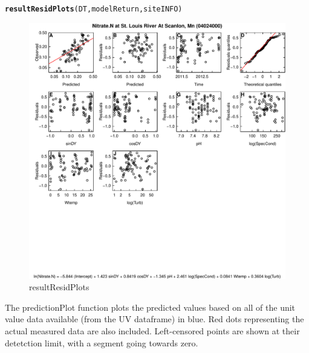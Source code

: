 \documentclass[a4paper,11pt]{article}\usepackage[]{graphicx}\usepackage[]{color}
\makeatletter
\def\maxwidth{ %
  \ifdim\Gin@nat@width>\linewidth
    \linewidth
  \else
    \Gin@nat@width
  \fi
}
\newcommand{\hlstd}[1]{\textcolor[rgb]{0.345,0.345,0.345}{#1}}%
\newcommand{\hlkwd}[1]{\textcolor[rgb]{0.737,0.353,0.396}{\textbf{#1}}}%
\newenvironment{kframe}{%
 \def\at@end@of@kframe{}%
 \ifinner\ifhmode%
  \def\at@end@of@kframe{\end{minipage}}%
  \begin{minipage}{\columnwidth}%
 \fi\fi%
 \def\FrameCommand##1{\hskip\@totalleftmargin \hskip-\fboxsep
 \colorbox{shadecolor}{##1}\hskip-\fboxsep
     \hskip-\linewidth \hskip-\@totalleftmargin \hskip\columnwidth}%
 \MakeFramed {\advance\hsize-\width
   \@totalleftmargin\z@ \linewidth\hsize
   \@setminipage}}%
 {\par\unskip\endMakeFramed%
 \at@end@of@kframe}
\newenvironment{knitrout}{}{} %
\makeatother
\begin{document}
\begin{knitrout}
\color{fgcolor}\begin{kframe}
\begin{alltt}
\hlkwd{resultResidPlots}\hlstd{(DT,modelReturn,siteINFO)}
\end{alltt}
\end{kframe}\begin{figure}[]

\includegraphics[width=\maxwidth]{figure/resultResidPlots} \caption[resultResidPlots]{resultResidPlots\label{fig:resultResidPlots}}
\end{figure}


\end{knitrout}


\FloatBarrier

The predictionPlot function plots the predicted values based on all of the unit value data available (from the UV dataframe) in blue. Red dots representing the actual measured data are also included. Left-censored points are shown at their detetction limit, with a segment going towards zero.
\end{document}
